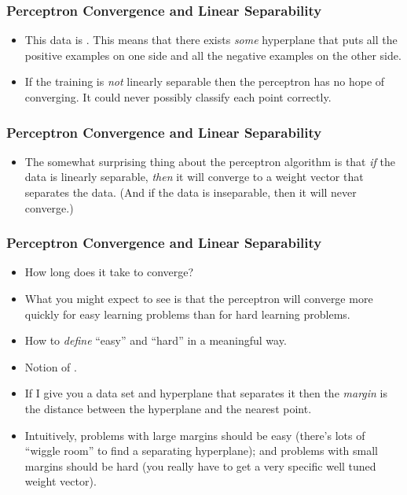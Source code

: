 \documentclass[trans]{beamer}
\begin{document}
\begin{frame}
  \frametitle{Perceptron Convergence and Linear Separability}
\begin{itemize}
\item
This data is .  This means
that there exists \emph{some} hyperplane that puts all the positive
examples on one side and all the negative examples on the other side.
\item 
If the training is \emph{not} linearly separable  then the perceptron has no hope of
converging.  It could never possibly classify each point correctly.
\end{itemize}

\end{frame}
\begin{frame}
  \frametitle{Perceptron Convergence and Linear Separability}
\begin{itemize}
\item
The somewhat surprising thing about the perceptron algorithm is that
\emph{if} the data is linearly separable, \emph{then} it will converge
to a weight vector that separates the data.  (And if the data is
inseparable, then it will never converge.)  
\end{itemize}
\end{frame}
\begin{frame}
  \frametitle{Perceptron Convergence and Linear Separability}
\begin{itemize}
\item
How long does it take to converge?  
\item 
What you might expect to see is that the perceptron will converge more
quickly for easy learning problems than for hard learning problems.
\item How to \emph{define}
``easy'' and ``hard'' in a meaningful way.  
\item Notion of .
\item 
  If I give you a
data set and hyperplane that separates it  then the \emph{margin} is the distance
between the hyperplane and the nearest point.
\item   Intuitively, problems
with large margins should be easy (there's lots of ``wiggle room'' to
find a separating hyperplane); and problems with small margins should
be hard (you really have to get a very specific well tuned weight
vector).
\end{itemize}
\end{frame}
\end{document}
